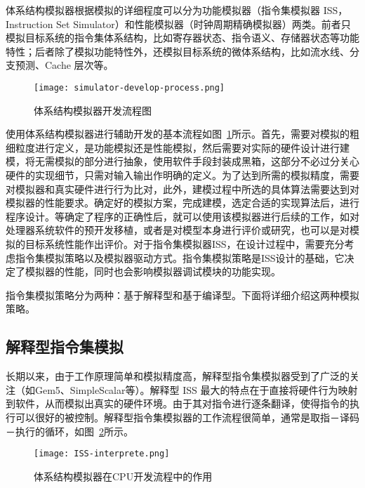 体系结构模拟器根据模拟的详细程度可以分为功能模拟器（指令集模拟器 ISS，Instruction  Set  Simulator）和性能模拟器（时钟周期精确模拟器）两类。前者只模拟目标系统的指令集体系结构，比如寄存器状态、指令语义、存储器状态等功能特性；后者除了模拟功能特性外，还模拟目标系统的微体系结构，比如流水线、分支预测、Cache 层次等\cite{cachecengcideng}。
\begin{figure}[h]
  \centering
  \texttt{[image: simulator-develop-process.png]}
  \caption{体系结构模拟器开发流程图}
  \label{fig:sim-dev-process}
\end{figure}



使用体系结构模拟器进行辅助开发的基本流程如图~\ref{fig:sim-dev-process}所示。首先，需要对模拟的粗细粒度进行定义，是功能模拟还是性能模拟，然后需要对实际的硬件设计进行建模，将无需模拟的部分进行抽象，使用软件手段封装成黑箱，这部分不必过分关心硬件的实现细节，只需对输入输出作明确的定义。为了达到所需的模拟精度，需要对模拟器和真实硬件进行行为比对，此外，建模过程中所选的具体算法需要达到对模拟器的性能要求。确定好的模拟方案，完成建模，选定合适的实现算法后，进行程序设计。等确定了程序的正确性后，就可以使用该模拟器进行后续的工作，如对处理器系统软件的预开发移植，或者是对模型本身进行评价或研究，也可以是对模拟的目标系统性能作出评价。对于指令集模拟器ISS，在设计过程中，需要充分考虑指令集模拟策略以及模拟器驱动方式。指令集模拟策略是ISS设计的基础，它决定了模拟器的性能，同时也会影响模拟器调试模块的功能实现。


指令集模拟策略分为两种：基于解释型和基于编译型。下面将详细介绍这两种模拟策略。



\subsection{解释型指令集模拟}
长期以来，由于工作原理简单和模拟精度高，解释型指令集模拟器受到了广泛的关注（如Gem5、SimpleScalar等）。解释型 ISS 最大的特点在于直接将硬件行为映射到软件\cite{jump}，从而模拟出真实的硬件环境。由于其对指令进行逐条翻译，使得指令的执行可以很好的被控制。解释型指令集模拟器的工作流程很简单，通常是取指－译码－执行的循环，如图~\ref{fig:ISS-interprete}所示。
\begin{figure}[h]
  \centering
  \texttt{[image: ISS-interprete.png]}
  \caption{体系结构模拟器在CPU开发流程中的作用}
  \label{fig:ISS-interprete}
\end{figure}


